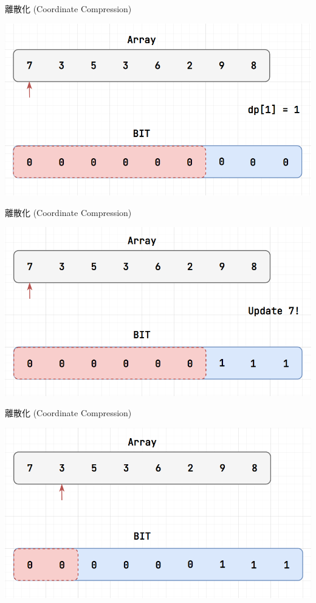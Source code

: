\documentclass[aspectratio=169]{beamer}
\begin{document}
    \begin{frame}{離散化 (Coordinate Compression)}
        \begin{center}
            \includegraphics[scale=0.45]{LIS/step2.png}
        \end{center}
    \end{frame}

    \begin{frame}{離散化 (Coordinate Compression)}
        \begin{center}
            \includegraphics[scale=0.45]{LIS/step3.png}
        \end{center}
    \end{frame}

    \begin{frame}{離散化 (Coordinate Compression)}
        \begin{center}
            \includegraphics[scale=0.45]{LIS/step4.png}
        \end{center}
    \end{frame}
\end{document}
